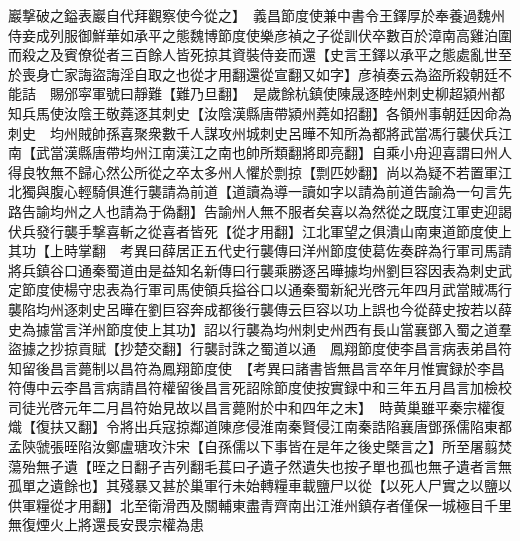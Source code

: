 巖撃破之鎰表巖自代拜觀察使今從之】　義昌節度使兼中書令王鐸厚於奉養過魏州侍妾成列服御鮮華如承平之態魏博節度使樂彦禎之子從訓伏卒數百於漳南高雞泊圍而殺之及賓僚從者三百餘人皆死掠其資裝侍妾而還【史言王鐸以承平之態處亂世至於喪身亡家誨盜誨淫自取之也從才用翻還從宣翻又如字】彦禎奏云為盜所殺朝廷不能詰　賜邠寜軍號曰靜難【難乃旦翻】　是歲餘杭鎮使陳晟逐睦州刺史柳超潁州都知兵馬使汝陰王敬蕘逐其刺史【汝陰漢縣唐帶潁州蕘如招翻】各領州事朝廷因命為刺史　均州賊帥孫喜聚衆數千人謀攻州城刺史呂曄不知所為都將武當馮行襲伏兵江南【武當漢縣唐帶均州江南漢江之南也帥所類翻將即亮翻】自乘小舟迎喜謂曰州人得良牧無不歸心然公所從之卒太多州人懼於剽掠【剽匹妙翻】尚以為疑不若置軍江北獨與腹心輕騎俱進行襲請為前道【道讀為導一讀如字以請為前道告諭為一句言先路告諭均州之人也請為于偽翻】告諭州人無不服者矣喜以為然從之既度江軍吏迎謁伏兵發行襲手撃喜斬之從喜者皆死【從才用翻】江北軍望之俱潰山南東道節度使上其功【上時掌翻　考異曰薛居正五代史行襲傳曰洋州節度使葛佐奏辟為行軍司馬請將兵鎮谷口通秦蜀道由是益知名新傳曰行襲乘勝逐呂曄據均州劉巨容因表為刺史武定節度使楊守忠表為行軍司馬使領兵搤谷口以通秦蜀新紀光啓元年四月武當賊馮行襲陷均州逐刺史呂曄在劉巨容奔成都後行襲傳云巨容以功上誤也今從薛史按若以薛史為據當言洋州節度使上其功】詔以行襲為均州刺史州西有長山當襄鄧入蜀之道羣盜據之抄掠貢賦【抄楚交翻】行襲討誅之蜀道以通　鳳翔節度使李昌言病表弟昌符知留後昌言薨制以昌符為鳳翔節度使　【考異曰諸書皆無昌言卒年月惟實録於李昌符傳中云李昌言病請昌符權留後昌言死詔除節度使按實録中和三年五月昌言加檢校司徒光啓元年二月昌符始見故以昌言薨附於中和四年之末】　時黄巢雖平秦宗權復熾【復扶又翻】令將出兵寇掠鄰道陳彦侵淮南秦賢侵江南秦誥陷襄唐鄧孫儒陷東都孟陝虢張晊陷汝鄭盧瑭攻汴宋【自孫儒以下事皆在是年之後史槩言之】所至屠翦焚蕩殆無孑遺【晊之日翻孑吉列翻毛萇曰孑遺孑然遺失也按孑單也孤也無孑遺者言無孤單之遺餘也】其殘暴又甚於巢軍行未始轉糧車載鹽尸以從【以死人尸實之以鹽以供軍糧從才用翻】北至衛滑西及關輔東盡青齊南出江淮州鎮存者僅保一城極目千里無復煙火上將還長安畏宗權為患

